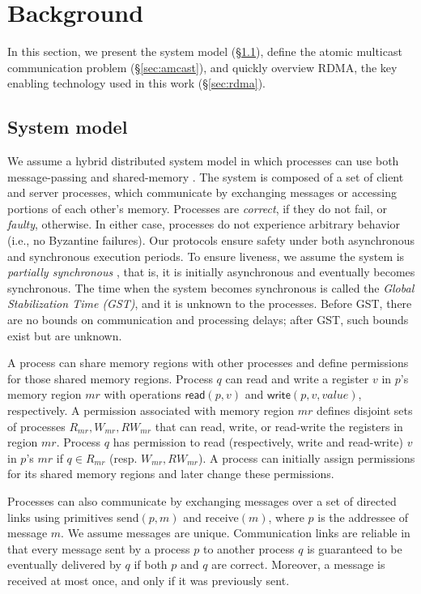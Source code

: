 
\clearpage
\section{Background}
\label{sec:background}

In this section, we present the system model (\S\ref{sec:system-model}), define the atomic multicast communication problem (\S\ref{sec:amcast}), and quickly overview RDMA, the key enabling technology used in this work (\S\ref{sec:rdma}).

\subsection{System model}
\label{sec:system-model}

We assume a hybrid distributed system model in which processes can use both message-passing and shared-memory \cite{Aguilera2019}.
The system is composed of a set of client and server processes, which communicate by exchanging messages or accessing portions of each other's memory.
Processes are \emph{correct}, if they do not fail, or \emph{faulty}, otherwise. 
In either case, processes do not experience arbitrary behavior (i.e., no Byzantine failures).
Our protocols ensure safety under both asynchronous and synchronous execution periods. 
To ensure liveness, we assume the system is \emph{partially synchronous} \cite{DLS88}, 
that is, it is initially asynchronous and eventually becomes synchronous. The time when the 
system becomes synchronous is called the \emph{Global Stabilization Time (GST)}, and it is unknown to the processes.
Before GST, there are no bounds on communication and processing delays; after GST, such bounds exist but are unknown. 

A process can share memory regions with other processes and define permissions for those shared memory regions. 
Process $q$ can read and write a register $v$ in $p$'s memory region $mr$ with operations $\textsf{read}(p,v)$ and $\textsf{write}(p,v,value)$, respectively.
A permission associated with memory region $mr$ defines disjoint sets of processes $R_{mr}, W_{mr}, RW_{mr}$ that can read, write, or read-write the registers in region $mr$. 
Process $q$ has permission to read (respectively, write and read-write) $v$ in $p$'s $mr$ if $q \in R_{mr}$ (resp. $W_{mr}, RW_{mr}$).
A process can initially assign permissions for its shared memory regions and later change these permissions.

Processes can also communicate by exchanging messages over a set of directed links using primitives \textsf{send}$(p, m)$ and \textsf{receive}$(m)$, where $p$ is the addressee of message $m$.
We assume messages are unique.
Communication links are reliable in that every message sent by a process $p$ to another process $q$ is guaranteed to be eventually delivered by $q$ if both $p$ and $q$ are correct.
Moreover, a message is received at most once, and only if it was previously sent.


